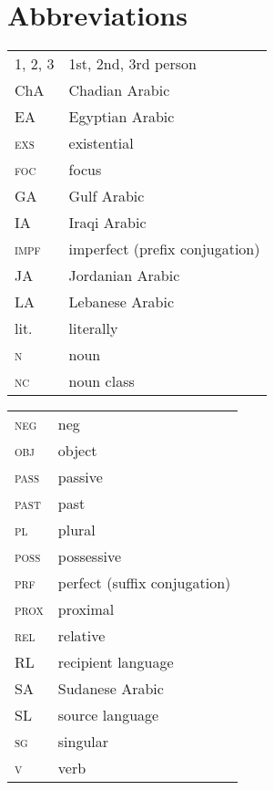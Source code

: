 \documentclass[output=paper]{langsci/langscibook}
\begin{document}
\section*{Abbreviations}
\begin{tabularx}{.5\textwidth}{@{}lQ@{}}
\textsc{1, 2, 3} & 1st, 2nd, 3rd person \\
ChA & Chadian Arabic \\
EA & Egyptian Arabic \\
\textsc{exs} & existential \\
\textsc{foc} & focus \\
GA & Gulf Arabic \\
IA & Iraqi Arabic \\
\textsc{impf} & imperfect (prefix conjugation) \\
JA & Jordanian Arabic \\
LA & Lebanese Arabic \\
lit. & literally \\
\textsc{n} & noun \\
\textsc{nc} & noun class \\
\end{tabularx}%
\begin{tabularx}{.5\textwidth}{@{}lQ@{}}
\textsc{neg} & neg \\
\textsc{obj} & object \\
\textsc{pass} & passive \\
\textsc{past} & past \\
\textsc{pl} & plural \\
\textsc{poss} & possessive \\
\textsc{prf} & perfect (suffix conjugation) \\
\textsc{prox} & proximal \\
\textsc{rel} & relative \\
RL & recipient language \\
SA & Sudanese Arabic \\
SL & source language \\
\textsc{sg} & singular \\
\textsc{v} & verb \\
\end{tabularx}%



\sloppy\printbibliography[heading=subbibliography,notkeyword=this]
\end{document}
